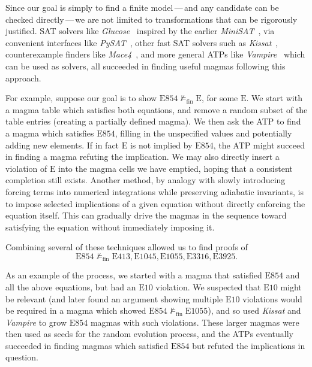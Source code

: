 \documentclass[12pt]{amsart}
\theoremstyle{definition}
\newcommand{\nmodels}{\not\models}
\newcommand{\nmodelsfin}{\nmodels_{\mathrm{fin}}}
\newcommand{\Eq}[1]{\mathrm{E}#1}
\newcommand{\E}{\mathrm{E}}
\begin{document}
 Since our goal is simply to find a finite model\,---\,and any candidate can be checked directly\,---\,we are not limited to transformations that can be rigorously justified.
  SAT solvers like
 \emph{Glucose}~\cite{DBLP:conf/ijcai/AudemardS09,DBLP:conf/cp/AudemardS12} inspired by the earlier \emph{MiniSAT}~\cite{DBLP:conf/sat/EenS03},
 via convenient interfaces like \emph{PySAT}~\cite{imms-sat18, itk-sat24},
 other fast SAT solvers such as \emph{Kissat}~\cite{BiereFazekasFleuryHeisinger-SAT-Competition-2020-solvers},
 counterexample finders like \emph{Mace4}~\cite{prover9-mace4}, and more general ATPs like
 \emph{Vampire}~\cite{DBLP:conf/cav/KovacsV13} which can be used as solvers, all succeeded in finding useful magmas following this approach.

 For example, suppose our goal is to show $\Eq{854} \nmodelsfin \E$, for some $\E$.  We start with a magma table which
 satisfies both equations, and remove a random subset of the table entries (creating a partially defined magma).  We then
 ask the ATP to find a magma which satisfies $\Eq{854}$, filling in the unspecified values and potentially adding new elements.
 If in fact $\E$ is not implied by $\Eq{854}$, the ATP might succeed in finding a magma refuting the implication.
 We may also directly insert a violation of $\E$ into the magma cells we have emptied, hoping that a consistent completion still exists.
 Another method, by analogy with slowly introducing forcing terms into numerical integrations while preserving adiabatic invariants,
 is to impose selected implications of a given equation without directly enforcing the equation itself.
 This can gradually drive the magmas in the sequence toward satisfying the equation without immediately imposing it.

Combining several of these techniques allowed us to find proofs of
$$\Eq{854} \nmodelsfin \Eq{413}, \Eq{1045}, \Eq{1055}, \Eq{3316}, \Eq{3925}.$$

As an example of the process, we started with a magma that satisfied $\Eq{854}$ and all the above equations,
but had an $\Eq{10}$ violation.  We suspected that $\Eq{10}$ might be relevant (and later found an
argument showing multiple $\Eq{10}$ violations would be required in a magma which showed $\Eq{854} \nmodelsfin \Eq{1055}$),
and so used \emph{Kissat} and \emph{Vampire} to grow $\Eq{854}$ magmas with such violations.  These larger magmas were then used as
seeds for the random evolution process, and the ATPs eventually succeeded in finding magmas which satisfied $\Eq{854}$ but refuted
the implications in question.
\end{document}
